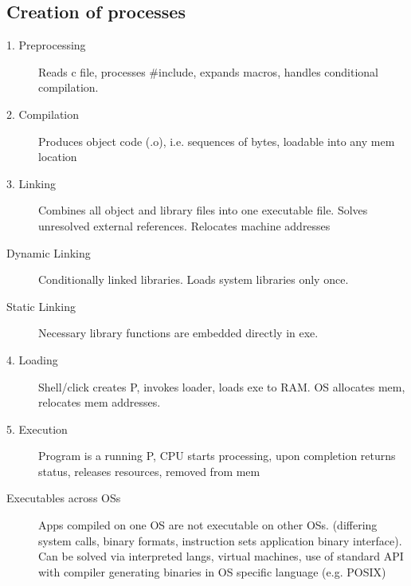 \subsection*{Creation of processes} %
\begin{description}
  \item[1. Preprocessing] Reads c file, processes \#include, expands macros, handles conditional compilation.
  \item[2. Compilation] Produces object code (.o), i.e. sequences of bytes, loadable into any mem location
  \item[3. Linking] Combines all object and library files into one executable file. Solves unresolved external references. Relocates machine addresses
  \item[Dynamic Linking] Conditionally linked libraries. Loads system libraries only once.
  \item[Static Linking] Necessary library functions are embedded directly in exe.
  \item[4. Loading] Shell/click creates P, invokes loader, loads exe to RAM. OS allocates mem, relocates mem addresses.
  \item[5. Execution] Program is a running P, CPU starts processing, upon completion returns status, releases resources, removed from mem

  \item[Executables across OSs] Apps compiled on one OS are not executable on other OSs. (differing system calls, binary formats, instruction sets application binary interface). Can be solved via interpreted langs, virtual machines, use of standard API with compiler generating binaries in OS specific language (e.g. POSIX)
\end{description}

